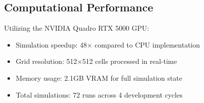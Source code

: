 \subsection{Computational Performance}

Utilizing the NVIDIA Quadro RTX 5000 GPU:
\begin{itemize}
    \item Simulation speedup: 48× compared to CPU implementation
    \item Grid resolution: 512×512 cells processed in real-time
    \item Memory usage: 2.1GB VRAM for full simulation state
    \item Total simulations: 72 runs across 4 development cycles
\end{itemize}